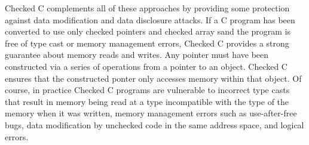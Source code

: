 Checked C complements all of these approaches by providing some protection against data modification and data disclosure attacks.  If a C program has 
been converted to use only checked pointers and checked array sand the program
is free of type cast or memory management errors, Checked C provides a strong
guarantee about memory reads and writes. Any pointer must have been constructed
via a  series of operations from a pointer to an object.   Checked C ensures 
that the constructed ponter only accesses memory within that object.  Of
course, in practice Checked C programs are vulnerable to incorrect type casts
 that result in memory being read at a type incompatible with the type of the memory when it was written, memory management errors such as use-after-free
 bugs, data modification by unchecked code in the same address space, and
 logical errors.
